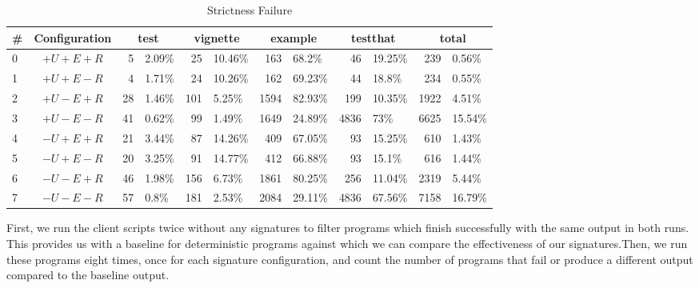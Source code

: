 \documentclass[review,nonacm,screen,acmsmall,anonymous=true]{acmart}
\begin{document}
%

\begin{table}
  \small
  \caption{Strictness Failure} \label{table:strictfail}
  \centering
  \begin{tabular}{lc|rl|rl|rl|rl|rl}
    \toprule
    \#&\textbf{Configuration}&\multicolumn{2}{c}{\textbf{test}}&\multicolumn{2}{c}{\textbf{vignette}}&\multicolumn{2}{c}{\textbf{example}}&\multicolumn{2}{c}{\textbf{testthat}}&\multicolumn{2}{c}{\textbf{total}}\\
    \midrule
    0&$+U+E+R$&5&2.09\%&25&10.46\%&163&68.2\%&46&19.25\%&239&0.56\%\\
    1&$+U+E-R$&4&1.71\%&24&10.26\%&162&69.23\%&44&18.8\%&234&0.55\%\\
    2&$+U-E+R$&28&1.46\%&101&5.25\%&1594&82.93\%&199&10.35\%&1922&4.51\%\\
    3&$+U-E-R$&41&0.62\%&99&1.49\%&1649&24.89\%&4836&73\%&6625&15.54\%\\
    4&$-U+E+R$&21&3.44\%&87&14.26\%&409&67.05\%&93&15.25\%&610&1.43\%\\
    5&$-U+E-R$&20&3.25\%&91&14.77\%&412&66.88\%&93&15.1\%&616&1.44\%\\
    6&$-U-E+R$&46&1.98\%&156&6.73\%&1861&80.25\%&256&11.04\%&2319&5.44\%\\
    7&$-U-E-R$&57&0.8\%&181&2.53\%&2084&29.11\%&4836&67.56\%&7158&16.79\%\\
    \bottomrule
  \end{tabular}
\end{table}

First, we run the client scripts twice without any signatures to filter programs
which finish successfully with the same output in both runs. This provides us
with a baseline for deterministic programs against which we can compare the
effectiveness of our signatures.Then, we run these programs eight times, once
for each signature configuration, and count the number of programs that fail or
produce a different output compared to the baseline output.
\end{document}
